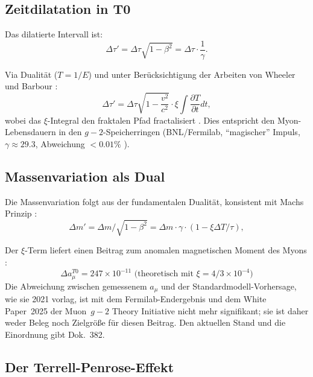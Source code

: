 	\subsection{Zeitdilatation in T0}
	Das dilatierte Intervall ist:
	\begin{equation}
		\Delta \tau' = \Delta \tau \sqrt{1 - \beta^2} = \Delta \tau \cdot \frac{1}{\gamma}.
	\end{equation}
	
	Via Dualität ($T = 1/E$) und unter Berücksichtigung der Arbeiten von Wheeler \cite{wheeler1990} und Barbour \cite{barbour1999}:
	\begin{equation}
		\Delta \tau' = \Delta \tau \sqrt{1 - \frac{v^2}{c^2}} \cdot \xi \int \frac{\partial T}{\partial t} dt,
	\end{equation}
	wobei das $\xi$-Integral den fraktalen Pfad fractalisiert \cite{pascher2025qm}. Dies entspricht den Myon-Lebensdauern in den $g-2$-Speicherringen (BNL/Fermilab, \enquote{magischer} Impuls, $\gamma \approx 29.3$, Abweichung $<0.01\%$ \cite{pdg2024, atlas2023}).
	
	\subsection{Massenvariation als Dual}
	Die Massenvariation folgt aus der fundamentalen Dualität, konsistent mit Machs Prinzip \cite{mach1883, sciama1953}:
	\begin{equation}
		\Delta m' = \Delta m / \sqrt{1 - \beta^2} = \Delta m \cdot \gamma \cdot (1 - \xi \Delta T / \tau),
	\end{equation}
	
	Der $\xi$-Term liefert einen Beitrag zum anomalen magnetischen Moment des Myons \cite{muong2_2023, pascher2025g2}:
	\begin{equation}
		\Delta a_\mu^{T0} = 247 \times 10^{-11} \text{ (theoretisch mit } \xi = 4/3 \times 10^{-4})
	\end{equation}
	Die Abweichung zwischen gemessenem $a_\mu$ und der Standardmodell-Vorhersage, wie sie 2021 vorlag, ist mit dem Fermilab-Endergebnis und dem White Paper~2025 der Muon~$g-2$ Theory Initiative nicht mehr signifikant; sie ist daher weder Beleg noch Zielgröße für diesen Beitrag. Den aktuellen Stand und die Einordnung gibt Dok.~382.
	
	\subsection{Der Terrell-Penrose-Effekt}
	
